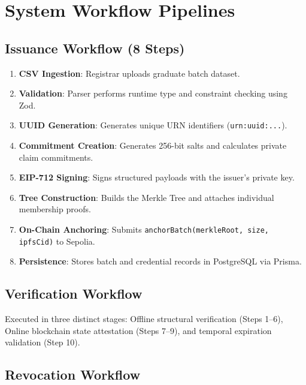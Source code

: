 \section{System Workflow Pipelines}

\subsection{Issuance Workflow (8 Steps)}
\begin{enumerate}
    \item \textbf{CSV Ingestion}: Registrar uploads graduate batch dataset.
    \item \textbf{Validation}: Parser performs runtime type and constraint checking using Zod.
    \item \textbf{UUID Generation}: Generates unique URN identifiers (\texttt{urn:uuid:...}).
    \item \textbf{Commitment Creation}: Generates 256-bit salts and calculates private claim commitments.
    \item \textbf{EIP-712 Signing}: Signs structured payloads with the issuer's private key.
    \item \textbf{Tree Construction}: Builds the Merkle Tree and attaches individual membership proofs.
    \item \textbf{On-Chain Anchoring}: Submits \texttt{anchorBatch(merkleRoot, size, ipfsCid)} to Sepolia.
    \item \textbf{Persistence}: Stores batch and credential records in PostgreSQL via Prisma.
\end{enumerate}

\subsection{Verification Workflow}
Executed in three distinct stages: Offline structural verification (Steps 1--6), Online blockchain state attestation (Steps 7--9), and temporal expiration validation (Step 10).

\subsection{Revocation Workflow}

